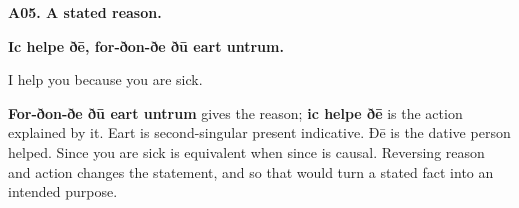 \par\begin{minipage}{\linewidth}\raggedright
\textbf{A05. A stated reason.}

\textbf{Ic helpe ðē, for-ðon-ðe ðū eart untrum.}

I help you because you are sick.

\textbf{For-ðon-ðe ðū eart untrum} gives the reason; \textbf{ic helpe ðē} is the action explained by it. Eart is second-singular present indicative. Ðē is the dative person helped. Since you are sick is equivalent when since is causal. Reversing reason and action changes the statement, and so that would turn a stated fact into an intended purpose.

\end{minipage}\par\addvspace{4pt}

